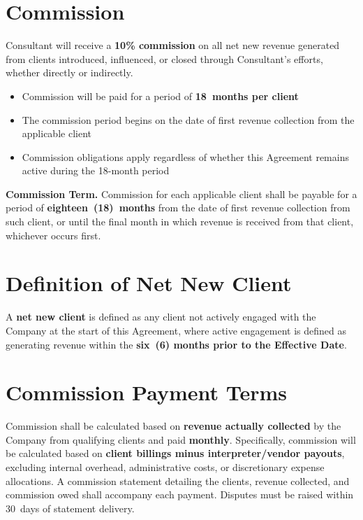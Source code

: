 \documentclass{toospoint}
\begin{document}
\section{Commission}

Consultant will receive a \textbf{10\% commission} on all net new revenue generated
from clients introduced, influenced, or closed through Consultant's efforts, whether
directly or indirectly.

\begin{itemize}[leftmargin=1.5em, itemsep=4pt, topsep=4pt]
  \item Commission will be paid for a period of \textbf{18~months per client}
  \item The commission period begins on the date of first revenue collection from
        the applicable client
  \item Commission obligations apply regardless of whether this Agreement remains
        active during the 18-month period
\end{itemize}

\vspace{4pt}
\noindent\textbf{Commission Term.} Commission for each applicable client shall be
payable for a period of \textbf{eighteen~(18)~months} from the date of first revenue
collection from such client, or until the final month in which revenue is received
from that client, whichever occurs first.

\section{Definition of Net New Client}

A \textbf{net new client} is defined as any client not actively engaged with the
Company at the start of this Agreement, where active engagement is defined as
generating revenue within the \textbf{six~(6) months prior to the Effective Date}.

\section{Commission Payment Terms}

Commission shall be calculated based on \textbf{revenue actually collected} by the
Company from qualifying clients and paid \textbf{monthly}. Specifically, commission
will be calculated based on \textbf{client billings minus interpreter/vendor payouts},
excluding internal overhead, administrative costs, or discretionary expense
allocations. A commission statement detailing the clients, revenue collected, and
commission owed shall accompany each payment. Disputes must be raised within
30~days of statement delivery.
\end{document}
